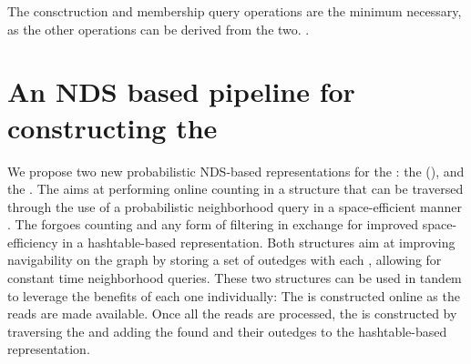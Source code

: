 The consctruction and membership query operations are the minimum necessary, as the other operations can be derived from the two. .

\section{An NDS based pipeline for constructing the \dBG}


We propose two new probabilistic NDS-based representations for the \dBG: the \dB \cm (\dBCM), and the \dBHT. The \dBCM aims at performing online \kmer counting in a structure that can be traversed through the use of a probabilistic neighborhood query in a space-efficient manner . The \dBHT forgoes \kmer counting and any form of filtering in exchange for improved space-efficiency in a hashtable-based representation. Both structures aim at improving navigability on the graph by storing a set of outedges with each \kmer, allowing for constant time neighborhood queries. These two structures can be used in tandem to leverage the benefits of each one individually: The \dBCM is constructed online as the reads are made available. Once all the reads are processed, the \dBHT is constructed by traversing the \dBCM and adding the found  and their outedges to the hashtable-based representation.

